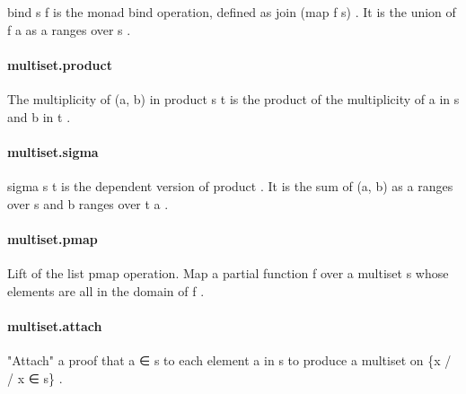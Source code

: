 \documentclass{article}
\begin{document}
\par
\colorbox[RGB]{253,246,227}{{{{\color[RGB]{101, 123, 131} bind s f }}}} is the monad bind operation, defined as 
\colorbox[RGB]{253,246,227}{{{{\color[RGB]{101, 123, 131} join (map f s) }}}}.
It is the union of 
\colorbox[RGB]{253,246,227}{{{{\color[RGB]{101, 123, 131} f a }}}} as 
\colorbox[RGB]{253,246,227}{{{{\color[RGB]{101, 123, 131} a }}}} ranges over 
\colorbox[RGB]{253,246,227}{{{{\color[RGB]{101, 123, 131} s }}}}.
\paragraph{multiset.product}
\par
The multiplicity of 
\colorbox[RGB]{253,246,227}{{{{\color[RGB]{101, 123, 131} (a, b) }}}} in 
\colorbox[RGB]{253,246,227}{{{{\color[RGB]{101, 123, 131} product s t }}}} is
the product of the multiplicity of 
\colorbox[RGB]{253,246,227}{{{{\color[RGB]{101, 123, 131} a }}}} in 
\colorbox[RGB]{253,246,227}{{{{\color[RGB]{101, 123, 131} s }}}} and 
\colorbox[RGB]{253,246,227}{{{{\color[RGB]{101, 123, 131} b }}}} in 
\colorbox[RGB]{253,246,227}{{{{\color[RGB]{101, 123, 131} t }}}}.
\paragraph{multiset.sigma}
\par
\colorbox[RGB]{253,246,227}{{{{\color[RGB]{101, 123, 131} sigma s t }}}} is the dependent version of 
\colorbox[RGB]{253,246,227}{{{{\color[RGB]{101, 123, 131} product }}}}. It is the sum of
\colorbox[RGB]{253,246,227}{{{{\color[RGB]{101, 123, 131} (a, b) }}}} as 
\colorbox[RGB]{253,246,227}{{{{\color[RGB]{101, 123, 131} a }}}} ranges over 
\colorbox[RGB]{253,246,227}{{{{\color[RGB]{101, 123, 131} s }}}} and 
\colorbox[RGB]{253,246,227}{{{{\color[RGB]{101, 123, 131} b }}}} ranges over 
\colorbox[RGB]{253,246,227}{{{{\color[RGB]{101, 123, 131} t a }}}}.
\paragraph{multiset.pmap}
\par
Lift of the list 
\colorbox[RGB]{253,246,227}{{{{\color[RGB]{101, 123, 131} pmap }}}} operation. Map a partial function 
\colorbox[RGB]{253,246,227}{{{{\color[RGB]{101, 123, 131} f }}}} over a multiset
\colorbox[RGB]{253,246,227}{{{{\color[RGB]{101, 123, 131} s }}}} whose elements are all in the domain of 
\colorbox[RGB]{253,246,227}{{{{\color[RGB]{101, 123, 131} f }}}}.
\paragraph{multiset.attach}
\par
"Attach" a proof that 
\colorbox[RGB]{253,246,227}{{{{\color[RGB]{101, 123, 131} a ∈ s }}}} to each element 
\colorbox[RGB]{253,246,227}{{{{\color[RGB]{101, 123, 131} a }}}} in 
\colorbox[RGB]{253,246,227}{{{{\color[RGB]{101, 123, 131} s }}}} to produce
a multiset on 
\colorbox[RGB]{253,246,227}{{{{\color[RGB]{101, 123, 131} \{x  }}}{{{\color[RGB]{181, 137, 0} / }}}{{{\color[RGB]{181, 137, 0} / }}}{{{\color[RGB]{101, 123, 131}  x ∈ s\} }}}}.
\end{document}
